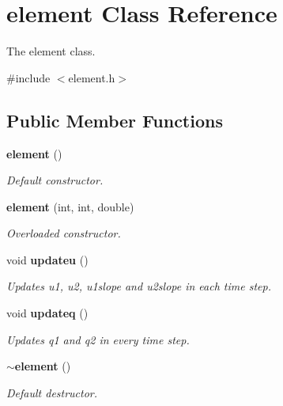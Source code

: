\section{element Class Reference}
\label{classelement}


The element class.  




{\ttfamily \#include $<$element.\-h$>$}

\subsection*{Public Member Functions}
\begin{DoxyCompactItemize}
\item 
{\bf element} ()
\begin{DoxyCompactList}\small\item\em Default constructor. \end{DoxyCompactList}\item 
{\bf element} (int, int, double)
\begin{DoxyCompactList}\small\item\em Overloaded constructor. \end{DoxyCompactList}\item 
void {\bf updateu} ()
\begin{DoxyCompactList}\small\item\em Updates u1, u2, u1slope and u2slope in each time step. \end{DoxyCompactList}\item 
void {\bf updateq} ()
\begin{DoxyCompactList}\small\item\em Updates q1 and q2 in every time step. \end{DoxyCompactList}\item 
{\bf $\sim$element} ()
\begin{DoxyCompactList}\small\item\em Default destructor. \end{DoxyCompactList}\end{DoxyCompactItemize}
